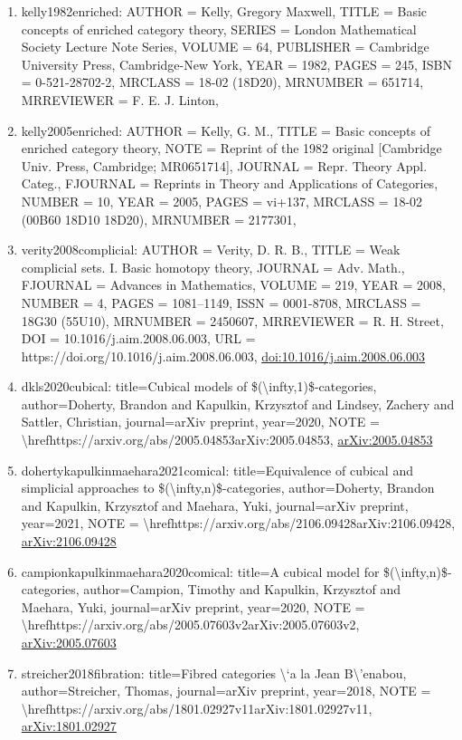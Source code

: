 \documentclass[11pt]{article}
\begin{document}
\begin{enumerate}[leftmargin=*]
  \item kelly1982enriched: AUTHOR = Kelly, Gregory Maxwell, TITLE = Basic concepts of enriched category theory, SERIES = London Mathematical Society Lecture Note Series, VOLUME = 64, PUBLISHER = Cambridge University Press, Cambridge-New York, YEAR = 1982, PAGES = 245, ISBN = 0-521-28702-2, MRCLASS = 18-02 (18D20), MRNUMBER = 651714, MRREVIEWER = F. E. J. Linton,
  \item kelly2005enriched: AUTHOR = Kelly, G. M., TITLE = Basic concepts of enriched category theory, NOTE = Reprint of the 1982 original [Cambridge Univ. Press, Cambridge; MR0651714], JOURNAL = Repr. Theory Appl. Categ., FJOURNAL = Reprints in Theory and Applications of Categories, NUMBER = 10, YEAR = 2005, PAGES = vi+137, MRCLASS = 18-02 (00B60 18D10 18D20), MRNUMBER = 2177301,
  \item verity2008complicial: AUTHOR = Verity, D. R. B., TITLE = Weak complicial sets. I. Basic homotopy theory, JOURNAL = Adv. Math., FJOURNAL = Advances in Mathematics, VOLUME = 219, YEAR = 2008, NUMBER = 4, PAGES = 1081--1149, ISSN = 0001-8708, MRCLASS = 18G30 (55U10), MRNUMBER = 2450607, MRREVIEWER = R. H. Street, DOI = 10.1016/j.aim.2008.06.003, URL = https://doi.org/10.1016/j.aim.2008.06.003, \href{https://doi.org/10.1016/j.aim.2008.06.003}{doi:10.1016/j.aim.2008.06.003}
  \item dkls2020cubical: title=Cubical models of \$(\textbackslash{}infty,1)\$-categories, author=Doherty, Brandon and Kapulkin, Krzysztof and Lindsey, Zachery and Sattler, Christian, journal=arXiv preprint, year=2020, NOTE = \textbackslash{}hrefhttps://arxiv.org/abs/2005.04853arXiv:2005.04853, \href{https://arxiv.org/abs/2005.04853}{arXiv:2005.04853}
  \item dohertykapulkinmaehara2021comical: title=Equivalence of cubical and simplicial approaches to \$(\textbackslash{}infty,n)\$-categories, author=Doherty, Brandon and Kapulkin, Krzysztof and Maehara, Yuki, journal=arXiv preprint, year=2021, NOTE = \textbackslash{}hrefhttps://arxiv.org/abs/2106.09428arXiv:2106.09428, \href{https://arxiv.org/abs/2106.09428}{arXiv:2106.09428}
  \item campionkapulkinmaehara2020comical: title=A cubical model for \$(\textbackslash{}infty,n)\$-categories, author=Campion, Timothy and Kapulkin, Krzysztof and Maehara, Yuki, journal=arXiv preprint, year=2020, NOTE = \textbackslash{}hrefhttps://arxiv.org/abs/2005.07603v2arXiv:2005.07603v2, \href{https://arxiv.org/abs/2005.07603}{arXiv:2005.07603}
  \item streicher2018fibration: title=Fibred categories \textbackslash{}`a la Jean B\textbackslash{}'enabou, author=Streicher, Thomas, journal=arXiv preprint, year=2018, NOTE = \textbackslash{}hrefhttps://arxiv.org/abs/1801.02927v11arXiv:1801.02927v11, \href{https://arxiv.org/abs/1801.02927}{arXiv:1801.02927}

\end{enumerate}
\end{document}
